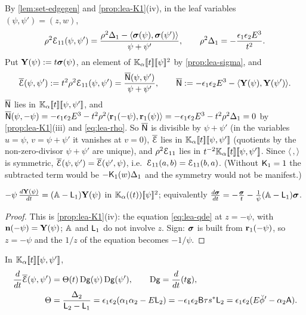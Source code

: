 By \cref{lem:set-edgegen} and \cref{prop:lea-K1}(iv), in the leaf variables $(\psi,\psi') = (z,w)$,
\[
\rho^2\mathcal{E}_{11}(\psi,\psi') = \frac{\rho^2\Delta_1 - \langle\boldsymbol{\sigma}(\psi),\boldsymbol{\sigma}(\psi')\rangle}{\psi+\psi'},\qquad \rho^2\Delta_1 = -\frac{\epsilon_1\epsilon_2E^3}{t^2}.
\]
Put $\mathbf{Y}(\psi) := t\boldsymbol{\sigma}(\psi)$, an element of $\mathbb{K}_{\alpha}[\![ t ]\!][\![ \psi ]\!]^2$ by \cref{prop:lea-sigma}, and
\begin{equation}
\label{eq:lea-Ebar}
\overline{\mathcal{E}}(\psi,\psi') := t^2\rho^2\mathcal{E}_{11}(\psi,\psi') = \frac{\overline{\mathsf{N}}(\psi,\psi')}{\psi+\psi'},\qquad \overline{\mathsf{N}} := -\epsilon_1\epsilon_2E^3 - \langle\mathbf{Y}(\psi),\mathbf{Y}(\psi')\rangle .
\end{equation}
$\overline{\mathsf{N}}$ lies in $\mathbb{K}_{\alpha}[\![ t ]\!][\![ \psi,\psi' ]\!]$, and $\overline{\mathsf{N}}(\psi,-\psi) = -\epsilon_1\epsilon_2E^3 - t^2\rho^2\langle\mathbf{r}_1(-\psi),\mathbf{r}_1(\psi)\rangle = -\epsilon_1\epsilon_2E^3 - t^2\rho^2\Delta_1 = 0$ by \cref{prop:lea-K1}(iii) and \eqref{eq:lea-rho}. So $\overline{\mathsf{N}}$ is divisible by $\psi+\psi'$ (in the variables $u = \psi$, $v = \psi+\psi'$ it vanishes at $v = 0$), $\overline{\mathcal{E}}$ lies in $\mathbb{K}_{\alpha}[\![ t ]\!][\![ \psi,\psi' ]\!]$ (quotients by the non-zero-divisor $\psi+\psi'$ are unique), and $\rho^2\mathcal{E}_{11}$ lies in $t^{-2}\mathbb{K}_{\alpha}[\![ t ]\!][\![ \psi,\psi' ]\!]$. Since $\langle\,,\rangle$ is symmetric, $\overline{\mathcal{E}}(\psi,\psi') = \overline{\mathcal{E}}(\psi',\psi)$, i.e.\ $\mathcal{E}_{11}(a,b) = \mathcal{E}_{11}(b,a)$. (Without $\mathsf{K}_{1} = 1$ the subtracted term would be $-\mathsf{K}_{1}(w)\Delta_1$ and the symmetry would not be manifest.)

\begin{lem}
\label{lem:lea-Yqde}
$-\psi\,\frac{d\mathbf{Y}(\psi)}{dt} = (\mathbb{A}-\mathsf{L}_1)\mathbf{Y}(\psi)$ in $\mathbb{K}_{\alpha}((t))[\![ \psi ]\!]^2$; equivalently $\frac{d\boldsymbol{\sigma}}{dt} = -\frac{\boldsymbol{\sigma}}{t} - \frac1\psi(\mathbb{A}-\mathsf{L}_1)\boldsymbol{\sigma}$.
\end{lem}

\begin{proof}
This is \cref{prop:lea-K1}(iv): the equation \eqref{eq:lea-qde} at $z = -\psi$, with $\mathbf{n}(-\psi) = \mathbf{Y}(\psi)$; $\mathbb{A}$ and $\mathsf{L}_1$ do not involve $z$. Sign: $\boldsymbol{\sigma}$ is built from $\mathbf{r}_1(-\psi)$, so $z = -\psi$ and the $1/z$ of the equation becomes $-1/\psi$.
\end{proof}

\begin{thm}
\label{thm:lea-flow}
In $\mathbb{K}_{\alpha}[\![ t ]\!][\![ \psi,\psi' ]\!]$,
\begin{align}
\label{eq:lea-flow}
\frac{d}{dt}\overline{\mathcal{E}}(\psi,\psi') &= \Theta(t)\,\mathrm{D}\mathsf{g}(\psi)\,\mathrm{D}\mathsf{g}(\psi'),\qquad \mathrm{D}\mathsf{g} = \frac{d}{dt}(t\mathsf{g}),\\
\label{eq:lea-Theta}
\Theta &= \frac{\Delta_2}{\mathsf{L}_2-\mathsf{L}_1} = \epsilon_1\epsilon_2(\alpha_1\alpha_2 - E\mathsf{L}_2) = -\epsilon_1\epsilon_2\mathsf{B}\tau s^{\ast}\mathsf{L}_2 = \epsilon_1\epsilon_2(E\breve{\phi}' - \alpha_2\mathsf{A}).
\end{align}
\end{thm}

